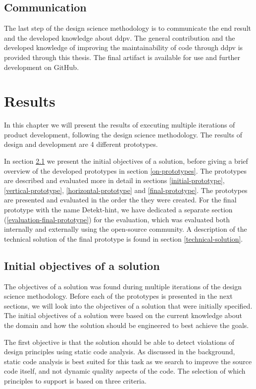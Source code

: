 \documentclass[pdftex,10pt,b5paper,twoside]{report}
\begin{document}
\section{Communication}
The last step of the design science methodology is to communicate the end result and the developed knowledge about \gls{ddpv}. The general contribution and the developed knowledge of improving the maintainability of code through \gls{ddpv} is provided through this thesis. The final artifact is available for use and further development on GitHub\cite{detekt-hint-repository}.
\cleardoublepage


\chapter{Results}
\label{results}

In this chapter we will present the results of executing multiple iterations of product development, following the design science methodology. The results of design and development are 4 different prototypes.

In section \ref{initial-os} we present the initial objectives of a solution, before giving a brief overview of the developed prototypes in section \ref{on-prototypes}. 
The prototypes are described and evaluated more in detail in sections \ref{initial-prototype}, \ref{vertical-prototype}, \ref{horizontal-prototype} and \ref{final-prototype}. The prototypes are presented and evaluated in the order the they were created. For the final prototype with the name Detekt-hint, we have dedicated a separate section (\ref{evaluation-final-prototype}) for the evaluation, which was evaluated both internally and externally using the open-source community. A description of the technical solution of the final prototype is found in section \ref{technical-solution}.

\section{Initial objectives of a solution}
\label{initial-os}
The objectives of a solution was found during multiple iterations of the design science methodology. Before each of the prototypes is presented in the next sections, we will look into the objectives of a solution that were initially specified. The initial objectives of a solution were based on the current knowledge about the domain and how the solution should be engineered to best achieve the goals. 

The first objective is that the solution should be able to detect violations of design principles using static code analysis. As discussed in the background, static code analysis is best suited for this task as we search to improve the source code itself, and not dynamic quality aspects of the code. The selection of which principles to support is based on three criteria. 
\end{document}
